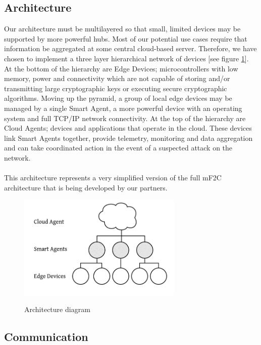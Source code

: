 \subsection{Architecture}

Our architecture must be multilayered so that small, limited devices may be supported by more powerful hubs. Most of our potential use cases require that information be aggregated at some central cloud-based server. Therefore, we have chosen to implement a three layer hierarchical network of devices [see figure \ref{fig:simplified_architecture}]. At the bottom of the hierarchy are Edge Devices; microcontrollers with low memory, power and connectivity which are not capable of storing and/or transmitting large cryptographic keys or executing secure cryptographic algorithms. Moving up the pyramid, a group of local edge devices may be managed by a single Smart Agent, a more powerful device with an operating system and full TCP/IP network connectivity. At the top of the hierarchy are Cloud Agents; devices and applications that operate in the cloud. These devices link Smart Agents together, provide telemetry, monitoring and data aggregation and can take coordinated action in the event of a suspected attack on the network.

\paragraph{}
This architecture represents a very simplified version of the full mF2C architecture that is being developed by our partners.

\begin{figure}[h]
  \centering
    \includegraphics[width=0.7\textwidth]{simplified_architecture}
    \label{fig:simplified_architecture}
    \caption{Architecture diagram}
\end{figure}


\subsection{Communication}

